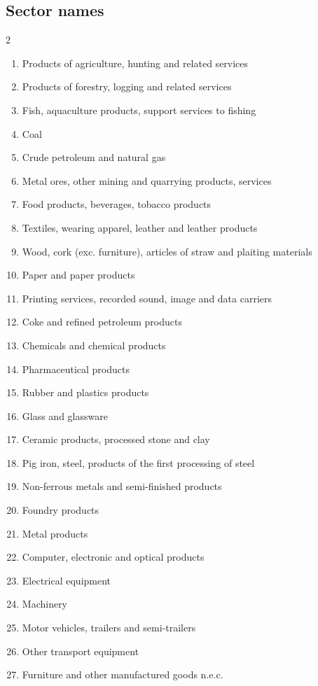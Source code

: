 \subsection*{Sector names}
\begin{multicols}{2}
\begin{enumerate}[leftmargin=*,itemsep=0pt,parsep=0pt]
\item Products of agriculture, hunting and related services
\item Products of forestry, logging and related services
\item Fish, aquaculture products, support services to fishing
\item Coal
\item Crude petroleum and natural gas
\item Metal ores, other mining and quarrying products, services
\item Food products, beverages, tobacco products
\item Textiles, wearing apparel, leather and leather products
\item Wood, cork (exc. furniture), articles of straw and plaiting materials
\item Paper and paper products
\item Printing services, recorded sound, image and data carriers
\item Coke and refined petroleum products
\item Chemicals and chemical products
\item Pharmaceutical products
\item Rubber and plastics products
\item Glass and glassware
\item Ceramic products, processed stone and clay
\item Pig iron, steel, products of the first processing of steel
\item Non-ferrous metals and semi-finished products
\item Foundry products
\item Metal products
\item Computer, electronic and optical products
\item Electrical equipment
\item Machinery
\item Motor vehicles, trailers and semi-trailers
\item Other transport equipment
\item Furniture and other manufactured goods n.e.c.

\end{enumerate}
\end{multicols}
